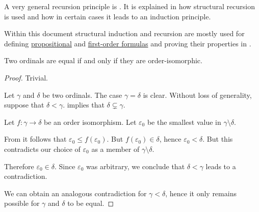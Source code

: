 \begin{remark}
\begin{thmenum}
     A very general recursion principle is . It is explained in  how structural recursion is used and how in certain cases it leads to an induction principle.

    Within this document structural induction and recursion are mostly used for defining \hyperref[def:propositional_syntax/formula]{propositional} and \hyperref[def:first_order_syntax/formula]{first-order formulas} and proving their properties in .
  \end{thmenum}
\end{remark}

\begin{proposition}\label{thm:ordinal_isomorphism}
  Two ordinals are equal if and only if they are order-isomorphic.
\end{proposition}
\begin{proof}
  \SufficiencySubProof Trivial.

  \NecessitySubProof Let \( \gamma \) and \( \delta \) be two ordinals. The case \( \gamma = \delta \) is clear. Without loss of generality, suppose that \( \delta < \gamma \).  implies that \( \delta \subsetneq \gamma \).

  Let \( f: \gamma \to \delta \) be an order isomorphism. Let \( \varepsilon_0 \) be the smallest value in \( \gamma \setminus \delta \).

  From  it follows that \( \varepsilon_0 \leq f(\varepsilon_0) \). But \( f(\varepsilon_0) \in \delta \), hence \( \varepsilon_0 < \delta \). But this contradicts our choice of \( \varepsilon_0 \) as a member of \( \gamma \setminus \delta \).

  Therefore \( \varepsilon_0 \in \delta \). Since \( \varepsilon_0 \) was arbitrary, we conclude that \( \delta < \gamma \) leads to a contradiction.

  We can obtain an analogous contradiction for \( \gamma < \delta \), hence it only remains possible for \( \gamma \) and \( \delta \) to be equal.
\end{proof}

